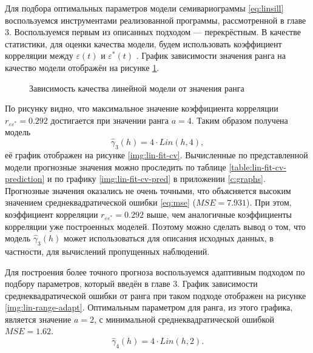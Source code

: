 Для подбора оптимальных параметров модели семивариограммы \eqref{eq:linsill} воспользуемся инструментами реализованной программы, рассмотренной в главе 3. Воспользуемся первым из описанных подходом --- перекрёстным. В качестве статистики, для оценки качества модели, будем использовать коэффициент корреляции между $ \varepsilon(t) $ и $ \varepsilon^{*}(t)$ . График зависимости значения ранга на качество модели отображён на рисунке \ref{img:lin-range-cv}.
\begin{figure}[ht]
\caption{Зависимость качества линейной модели от значения ранга}
\label{img:lin-range-cv}
\end{figure}
По рисунку видно, что максимальное значение коэффициента корреляции $ r_{\varepsilon\varepsilon^{*}} = 0.292 $ достигается при значении ранга $ a = 4 $. Таким образом получена модель
\begin{equation}
\label{eq:gamma3}
 	\widehat{\gamma}_3(h) = 4 \cdot Lin(h, 4),
\end{equation}
её график отображен на рисунке \ref{img:lin-fit-cv}. Вычисленные по представленной модели прогнозные значения можно проследить по таблице \ref{table:lin-fit-cv-prediction} и по графику \ref{img:lin-fit-cv-pred} в приложении \ref{c:graphs}. Прогнозные значения оказались не очень точными, что объясняется высоким значением среднеквадратической ошибки \eqref{eq:mse} ($ MSE = 7.931 $). При этом, коэффициент корреляции $ r_{\varepsilon\varepsilon^{*}} = 0.292 $ выше, чем аналогичные коэффициенты корреляции уже построенных моделей. Поэтому можно сделать вывод о том, что модель $ \widehat{\gamma}_3(h) $ может использоваться для описания исходных данных, в частности, для вычислений пропущенных наблюдений.



Для построения более точного прогноза воспользуемся адаптивным подходом по подбору параметров, который введён в главе 3. График зависимости среднеквадратической ошибки от ранга при таком подходе отображен на рисунке \ref{img:lin-range-adapt}. Оптимальным параметром для ранга, из этого графика, является значение $ a = 2 $, с минимальной среднеквадратической ошибкой $ MSE = 1.62 $.
\begin{equation}
\label{eq:gamma4}
 	\widehat{\gamma}_4(h) = 4 \cdot Lin(h, 2).
\end{equation}

